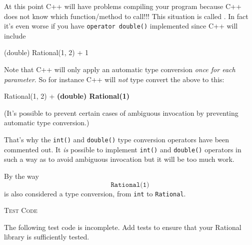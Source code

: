 {At this point C++ will have problems compiling your program
because C++ does not know
which function/method to call!!!
This situation is called .
In fact it's even worse if you have
\texttt{operator double()} implemented since C++ will include
\begin{console}
(double) Rational(1, 2) + 1
\end{console}
Note that C++ will only apply an automatic type conversion
\textit{once for each parameter}.
So for instance C++ will \textit{not} type convert the above to this:
\begin{console}[commandchars=\\\{\}]
Rational(1, 2) + \textbf{(double) Rational(1)}
\end{console}
(It's possible to prevent certain cases of ambiguous invocation by
preventing automatic type conversion.)

That's why the \texttt{int()} and \texttt{double()} type conversion
operators have been commented out.
It \textit{is} possible to implement \texttt{int()} and \texttt{double()}
operators in such a way as to
avoid ambiguous invocation but it will be too much work.

By the way
\[
	\texttt{Rational(1)}
\]
is also considered a type conversion, from \texttt{int} to \texttt{Rational}. 




\newpage
\textsc{Test Code}

The following test code is incomplete. Add tests to ensure that your Rational library
is sufficiently tested.
{\small
{}
}


}
